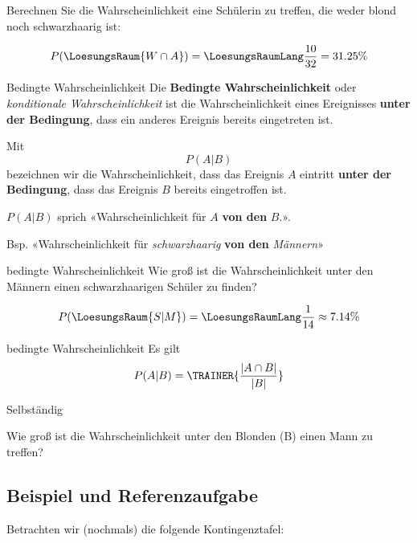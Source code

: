 Berechnen Sie die Wahrscheinlichkeit eine Schülerin zu treffen, die
weder blond noch schwarzhaarig ist:

\leserluft

$$P(\LoesungsRaum{W \cap A}) = \LoesungsRaumLang{\frac{10}{32} = 31.25\%}$$

\newpage


\begin{definition}{Bedingte Wahrscheinlichkeit}{}
Die \textbf{Bedingte Wahrscheinlichkeit} oder \textit{konditionale
  Wahrscheinlichkeit} ist die Wahrscheinlichkeit eines Ereignisses
\textbf{unter der Bedingung}, dass ein anderes Ereignis bereits
eingetreten ist.

  Mit
  $$P(A | B)$$
  bezeichnen wir die Wahrscheinlichkeit, dass das Ereignis $A$
  eintritt \textbf{unter der Bedingung}, dass das Ereignis $B$ bereits
  eingetroffen ist.
\end{definition}

\begin{bemerkung}{}{}
  $P(A|B)$ sprich «Wahrscheinlichkeit für $A$ \textbf{von den} $B$.».

  Bsp. «Wahrscheinlichkeit für \textit{schwarzhaarig} \textbf{von den} \textit{Männern}»  
\end{bemerkung}

\begin{beispiel}{bedingte Wahrscheinlichkeit}{}
  Wie groß ist die Wahrscheinlichkeit unter den Männern einen schwarzhaarigen Schüler zu finden?

  \leserluft

  $$P(\LoesungsRaum{S|M})  = \LoesungsRaumLang{\frac{1}{14} \approx 7.14\%}$$
\end{beispiel}

\begin{gesetz}{bedingte Wahrscheinlichkeit}{}
  Es gilt
  $$P(A|B) = \TRAINER{\frac{|A\cap B|}{|B|}}$$  
\end{gesetz}

Selbständig

Wie groß ist die Wahrscheinlichkeit unter den Blonden (B) einen Mann
zu treffen?

\newpage

\subsection{Beispiel und Referenzaufgabe}
Betrachten wir (nochmals) die folgende Kontingenztafel:


